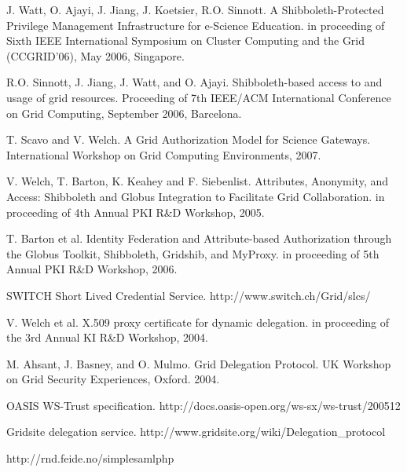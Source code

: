\documentclass[conference]{IEEEtran}
\begin{document}
\begin{thebibliography}{99}
% 
% 
% 
% 
% 
% 
J. Watt, O. Ajayi, J. Jiang, J. Koetsier, R.O. Sinnott. A Shibboleth-Protected 
Privilege Management Infrastructure for e-Science Education. in proceeding of Sixth 
IEEE International Symposium on Cluster Computing and the Grid (CCGRID'06), May 2006,
Singapore.

R.O. Sinnott, J. Jiang, J. Watt, and O. Ajayi. Shibboleth-based access to and 
usage of grid resources. Proceeding of 7th IEEE/ACM International Conference on 
Grid Computing, September 2006, Barcelona.

T. Scavo and V. Welch. A Grid Authorization Model for Science Gateways. International 
Workshop on Grid Computing Environments, 2007.

V. Welch, T. Barton, K. Keahey and F. Siebenlist. Attributes, Anonymity, and 
Access: Shibboleth and Globus Integration to Facilitate Grid Collaboration. in 
proceeding of 4th Annual PKI R\&D Workshop, 2005.

T. Barton et al. Identity Federation and Attribute-based Authorization 
through the Globus Toolkit, Shibboleth, Gridshib, and MyProxy. in proceeding 
of 5th Annual PKI R\&D Workshop, 2006.

SWITCH Short Lived Credential Service. http://www.switch.ch/Grid/slcs/

V. Welch et al. X.509 proxy certificate for dynamic delegation. in proceeding 
of the 3rd Annual KI R\&D Workshop, 2004.

M. Ahsant, J. Basney, and O. Mulmo. Grid Delegation Protocol. UK Workshop on 
Grid Security Experiences, Oxford. 2004.

OASIS WS-Trust specification. http://docs.oasis-open.org/ws-sx/ws-trust/200512

Gridsite delegation service. http://www.gridsite.org/wiki/Delegation\_protocol

http://rnd.feide.no/simplesamlphp

\end{thebibliography}
\end{document}
